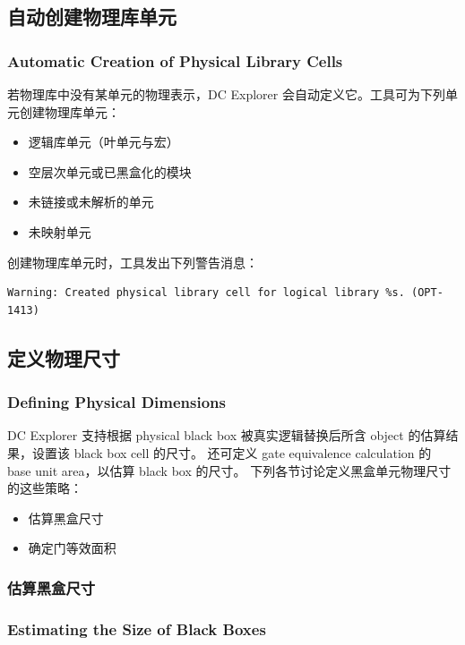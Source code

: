 \subsection{自动创建物理库单元}
\subsubsection*{Automatic Creation of Physical Library Cells}

若物理库中没有某单元的物理表示，DC Explorer 会自动定义它。工具可为下列单元创建物理库单元：
\begin{itemize}
  \item 逻辑库单元（叶单元与宏）
  \item 空层次单元或已黑盒化的模块
  \item 未链接或未解析的单元
  \item 未映射单元
\end{itemize}

创建物理库单元时，工具发出下列警告消息：
\begin{lstlisting}
Warning: Created physical library cell for logical library %s. (OPT-1413)
\end{lstlisting}

\subsection{定义物理尺寸}
\subsubsection*{Defining Physical Dimensions}

DC Explorer 支持根据 physical black box 被真实逻辑替换后所含 object 的估算结果，设置该 black box cell 的尺寸。
还可定义 gate equivalence calculation 的 base unit area，以估算 black box 的尺寸。
下列各节讨论定义黑盒单元物理尺寸的这些策略：
\begin{itemize}
  \item 估算黑盒尺寸
  \item 确定门等效面积
\end{itemize}

\subsubsection{估算黑盒尺寸}
\subsubsection*{Estimating the Size of Black Boxes}

